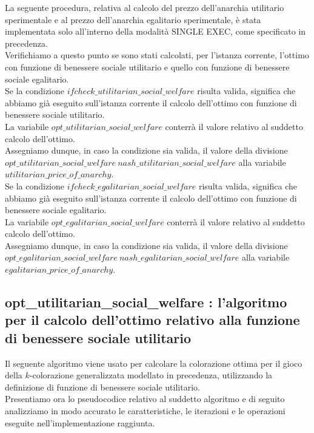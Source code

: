 La seguente procedura, relativa al calcolo del prezzo dell'anarchia utilitario sperimentale e al prezzo dell'anarchia egalitario sperimentale, è stata implementata solo all'interno della modalità SINGLE EXEC, come specificato in precedenza.\\

Verifichiamo a questo punto se sono stati calcolati, per l'istanza corrente, l'ottimo con funzione di benessere sociale utilitario e quello con funzione di benessere sociale egalitario.\\

Se la condizione $if check\_utilitarian\_social\_welfare$ risulta valida, significa che abbiamo già eseguito sull'istanza corrente il calcolo dell'ottimo con funzione di benessere sociale utilitario.\\
La variabile $opt\_utilitarian\_social\_welfare$ conterrà il valore relativo al suddetto calcolo dell'ottimo.\\
Assegniamo dunque, in caso la condizione sia valida, il valore della divisione $opt\_utilitarian\_social\_welfare \ nash\_utilitarian\_social\_welfare$ alla variabile $utilitarian\_price\_of\_anarchy$.\\

Se la condizione $if check\_egalitarian\_social\_welfare$ risulta valida, significa che abbiamo già eseguito sull'istanza corrente il calcolo dell'ottimo con funzione di benessere sociale egalitario.\\
La variabile $opt\_egalitarian\_social\_welfare$ conterrà il valore relativo al suddetto calcolo dell'ottimo.\\
Assegniamo dunque, in caso la condizione sia valida, il valore della divisione $opt\_egalitarian\_social\_welfare \ nash\_egalitarian\_social\_welfare$ alla variabile $egalitarian\_price\_of\_anarchy$.\\


\newpage
\subsection{opt\_utilitarian\_social\_welfare : l'algoritmo per il calcolo dell'ottimo relativo alla funzione di benessere sociale utilitario}
\justify
Il seguente algoritmo viene usato per calcolare la colorazione ottima per il gioco della \(k\)-colorazione generalizzata modellato in precedenza, utilizzando la definizione di funzione di benessere sociale utilitario.\\

Presentiamo ora lo pseudocodice relativo al suddetto algoritmo e di seguito analizziamo in modo accurato le caratteristiche, le iterazioni e le operazioni eseguite nell'implementazione raggiunta.\\

